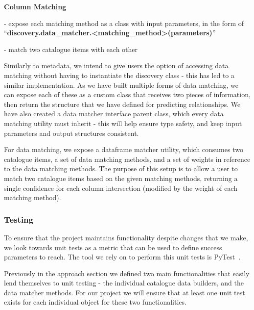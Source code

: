 \bigbreak
\textbf{Column Matching}

- expose each matching method as a class with input parameters, in the form of
``\textbf{discovery.data\_matcher.<matching\_method>(parameters)}''

- match two catalogue items with each other

Similarly to metadata, we intend to give users the option of accessing data matching without having to instantiate the
discovery class - this has led to a similar implementation.
As we have built multiple forms of data matching, we can expose each of these as a custom class that receives two pieces
of information, then return the structure that we have defined for predicting relationships.
We have also created a data matcher interface parent class, which every data matching utility must inherit - this will
help ensure type safety, and keep input parameters and output structures consistent.

For data matching, we expose a dataframe matcher utility, which consumes two catalogue items, a set of data matching
methods, and a set of weights in reference to the data matching methods.
The purpose of this setup is to allow a user to match two catalogue items based on the given matching methods, returning
a single confidence for each column intersection (modified by the weight of each matching method).

\subsubsection{Testing}
To ensure that the project maintains functionality despite changes that we make, we look towards unit tests as a metric
that can be used to define success parameters to reach.
The tool we rely on to perform this unit tests is PyTest~\cite{PyTest}.

Previously in the approach section we defined two main functionalities that easily lend themselves to unit testing -
the individual catalogue data builders, and the data matcher methods.
For our project we will ensure that at least one unit test exists for each individual object for these two
functionalities.

